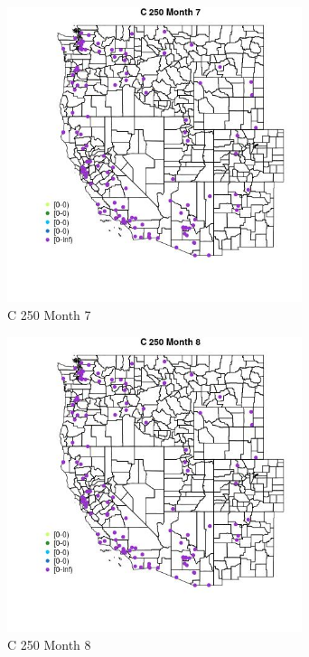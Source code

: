 \begin{figure} 
\centering  
\includegraphics[width=0.77\textwidth]{Code_Outputs/Report_ML_input_PM25_Step4_part_e_de_duplicated_aves_MapObsMo7C_250.jpg} 
\caption{\label{fig:Report_ML_input_PM25_Step4_part_e_de_duplicated_avesMapObsMo7C_250}C 250 Month 7} 
\end{figure} 
 

\begin{figure} 
\centering  
\includegraphics[width=0.77\textwidth]{Code_Outputs/Report_ML_input_PM25_Step4_part_e_de_duplicated_aves_MapObsMo8C_250.jpg} 
\caption{\label{fig:Report_ML_input_PM25_Step4_part_e_de_duplicated_avesMapObsMo8C_250}C 250 Month 8} 
\end{figure} 
 

